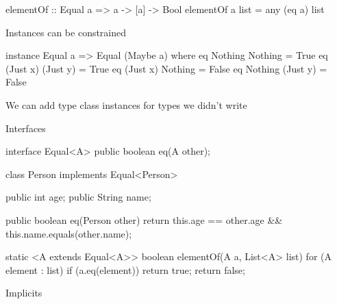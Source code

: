 \documentclass[usenames,dvipsnames,svgnames,table,aspectratio=169,mathserif]{beamer}
\newcommand{\nl}{\vspace{\baselineskip}}
\newcommand{\pnl}{\pause \nl}
\begin{document}
\begin{frame}[fragile]
\begin{haskellcode}
elementOf :: Equal a => a -> [a] -> Bool
elementOf a list = any (eq a) list
\end{haskellcode}
\end{frame}


\begin{frame}[fragile]
Instances can be constrained

\nl

\begin{haskellcode}
instance Equal a => Equal (Maybe a) where
  eq Nothing  Nothing  = True
  eq (Just x) (Just y) = True
  eq (Just x) Nothing  = False
  eq Nothing  (Just y) = False
\end{haskellcode}

\pnl

We can add type class instances for types we didn't write
\end{frame}




\begin{frame}
\begin{center}
\huge{Interfaces}
\end{center}
\end{frame}


\begin{frame}[fragile]
\begin{javacode}
interface Equal<A> {
  public boolean eq(A other);
}
\end{javacode}

\pause

\begin{javacode}
class Person implements Equal<Person> {
  public int age;
  public String name;

  public boolean eq(Person other) {
    return this.age == other.age && this.name.equals(other.name);
  }
}
\end{javacode}
\end{frame}


\begin{frame}[fragile]
\begin{javacode}
static <A extends Equal<A>> boolean elementOf(A a, List<A> list) {
  for (A element : list) {
    if (a.eq(element)) return true;
  }
  return false;
}
\end{javacode}

\end{frame}


\begin{frame}

\end{frame}




\begin{frame}
\begin{center}
\huge{Implicits}
\end{center}
\end{frame}
\end{document}
